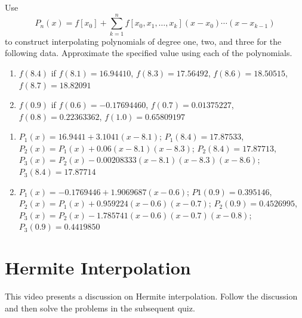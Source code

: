 \begin{myexercise}%
Use 
\[P_n(x)=f[x_0]+\sum^n_{k=1}f[x_0, x_1, \ldots, x_k](x-x_0)\cdots(x-x_{k-1})\]
to construct interpolating polynomials of degree one, two, and three for the following data. Approximate the specified value using each of the polynomials.
\begin{enumerate}[label=(\alph*)]
\item $f(8.4)$ if $f(8.1)=16.94410$, $f(8.3)=17.56492$, $f(8.6)=18.50515$, $f(8.7)=18.82091$
\item $f(0.9)$ if $f(0.6)=-0.17694460$, $f(0.7)=0.01375227$, $f(0.8)=0.22363362$, $f(1.0)=0.65809197$
\end{enumerate}
\begin{mysolution}
\begin{enumerate}[label=(\alph*)]
\item $P_1(x) = 16.9441 +3.1041(x -8.1)$; $P_1(8.4) = 17.87533$, $P_2(x) = P_1(x) + 0.06(x - 8.1)(x - 8.3)$; $P_2(8.4) = 17.87713$, $P_3(x) = P_2(x)-0.00208333(x- 8.1)(x - 8.3)(x-8.6)$; $P_3(8.4) = 17.87714$
\item $P_1(x) =-0.1769446 +1.9069687(x-0.6)$; $P1(0.9) = 0.395146$, $P_2(x) = P_1(x) +0.959224(x-0.6)(x-0.7)$; $P_2(0.9) = 0.4526995$, $P_3(x) = P_2(x)-1.785741(x-0.6)(x-0.7)(x-0.8)$; $P_3(0.9) = 0.4419850$
\end{enumerate}
\end{mysolution}
\end{myexercise}



\section{Hermite Interpolation}
\videolesson
\begin{selfvideo}[2]
This video presents a discussion on Hermite interpolation. Follow the discussion and then solve the problems in the subsequent quiz.
\end{selfvideo}


